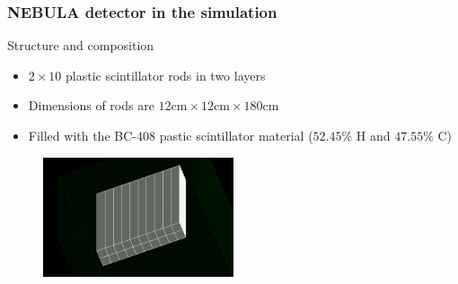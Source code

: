 \begin{frame}
\frametitle{NEBULA detector in the simulation}

\begin{exampleblock}{Structure and composition}
	\begin{itemize}
		\item $2 \times 10$ plastic scintillator rods in two layers
		\item Dimensions of rods are $12\text{cm} \times 12\text{cm} \times 180\text{cm}$
		\item Filled with the BC-$408$ pastic scintillator material ($52.45\%$ H and $47.55\%$ C)
	\end{itemize}
\end{exampleblock}

\begin{figure}
	\includegraphics[width=0.5\textwidth]{images/nebula.png}
\end{figure}


\end{frame}